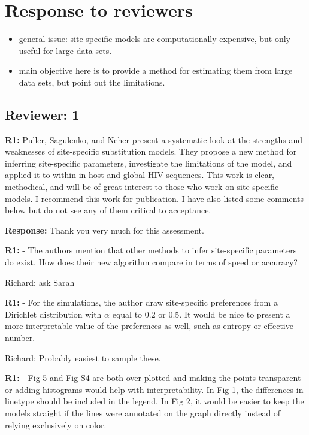 \documentclass[aps,rmp,onecolumn]{revtex4-1}
\newcommand{\Richard}[1]{{\color{drab}Richard: #1}}
\newcommand{\refa}[1]{\textbf{R1:} #1}
\newcommand{\response}[1]{{\color{black}\textbf{Response:} #1}}
\begin{document}
\section*{Response to reviewers}

\begin{itemize}
    \item general issue: site specific models are computationally expensive, but only useful for large data sets.
    \item main objective here is to provide a method for estimating them from large data sets, but point out the limitations.
\end{itemize}


\subsection*{Reviewer: 1}

\refa{Puller, Sagulenko, and Neher present a systematic look at the strengths and weaknesses of site-specific substitution models. They propose a new method for inferring site-specific parameters, investigate the limitations of the model, and applied it to within-in host and global HIV sequences. This work is clear, methodical, and will be of great interest to those who work on site-specific models. I recommend this work for publication. I have also listed some comments below but do not see any of them critical to acceptance.}

\response{Thank you very much for this assessment.}

\refa{- The authors mention that other methods to infer site-specific parameters do exist. How does their new algorithm compare in terms of speed or accuracy?}

\Richard{ask Sarah}

\refa{- For the simulations, the author draw site-specific preferences from a Dirichlet distribution with $\alpha$ equal to 0.2 or 0.5. It would be nice to present a more interpretable value of the preferences as well, such as entropy or effective number.}

\Richard{Probably easiest to sample these. }


\refa{- Fig 5 and Fig S4 are both over-plotted and making the points transparent or adding histograms would help with interpretability. In Fig 1, the differences in linetype should be included in the legend. In Fig 2, it would be easier to keep the models straight if the lines were annotated on the graph directly instead of relying exclusively on color.}
\end{document}
